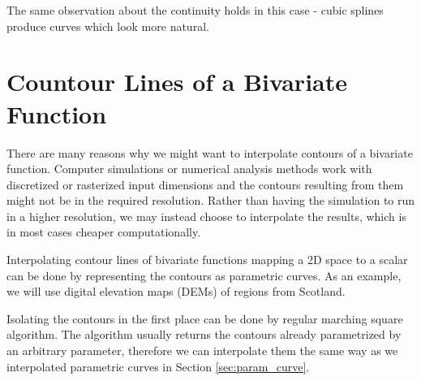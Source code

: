\documentclass[a4paper,10pt]{report}
\begin{document}
The same observation about the continuity holds in this case - cubic splines produce curves which look more natural.

\section{Countour Lines of a Bivariate Function}
There are many reasons why we might want to interpolate contours of a bivariate function. Computer simulations or numerical analysis methods work with discretized or rasterized input dimensions and the contours resulting from them might not be in the required resolution. Rather than having the simulation to run in a higher resolution, we may instead choose to interpolate the results, which is in most cases cheaper computationally.

Interpolating contour lines of bivariate functions mapping a 2D space to a scalar can be done by representing the contours as parametric curves. As an example, we will use digital elevation maps (DEMs) of regions from Scotland.

Isolating the contours in the first place can be done by regular marching square algorithm. The algorithm usually returns the contours already parametrized by an arbitrary parameter, therefore we can interpolate them the same way as we interpolated parametric curves in Section \ref{sec:param_curve}.
\end{document}

